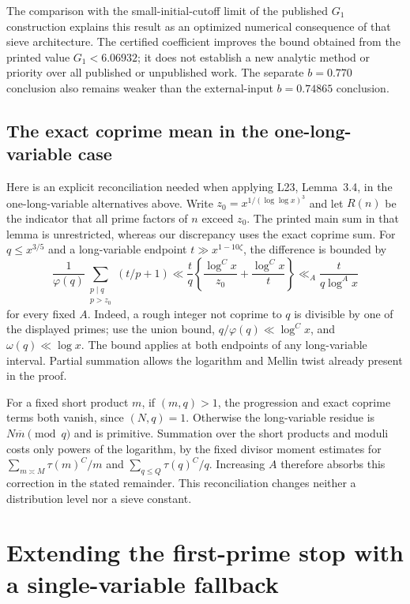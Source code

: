 \documentclass[11pt]{article}
\begin{document}
The comparison with the small-initial-cutoff limit of the published
$G_1$ construction explains this result as an optimized numerical
consequence of that sieve architecture. The certified coefficient
improves the bound obtained from the printed value $G_1<6.06932$;
it does not establish a new analytic method or priority over all
published or unpublished work. The separate $b=0.770$ conclusion
also remains weaker than the external-input $b=0.74865$ conclusion.

\subsection{The exact coprime mean in the one-long-variable case}
\label{sec:one-long-coprime-mean}
Here is an explicit reconciliation needed when applying L23,
Lemma~3.4, in the one-long-variable alternatives above.
Write $z_0=x^{1/(\log\log x)^3}$ and let $R(n)$ be the indicator
that all prime factors of $n$ exceed $z_0$. The printed main
sum in that lemma is unrestricted, whereas our discrepancy uses
the exact coprime sum. For $q\le x^{3/5}$ and a long-variable
endpoint $t\gg x^{1-10\zeta}$, the difference is bounded by
\[
 \frac{1}{\varphi(q)}
 \sum_{\substack{p\mid q\\p>z_0}}(t/p+1)
 \ll \frac tq\left\{\frac{\log^C x}{z_0}
                         +\frac{\log^C x}{t}\right\}
 \ll_A\frac{t}{q\log^A x}
\]
for every fixed $A$. Indeed, a rough integer not coprime to
$q$ is divisible by one of the displayed primes; use the union
bound, $q/\varphi(q)\ll\log^C x$, and
$\omega(q)\ll\log x$. The bound applies at both endpoints
of any long-variable interval. Partial summation allows the
logarithm and Mellin twist already present in the proof.

For a fixed short product $m$, if $(m,q)>1$, the progression
and exact coprime terms both vanish, since $(N,q)=1$.
Otherwise the long-variable residue is $N\overline m\pmod q$
and is primitive. Summation over the short products and
moduli costs only powers of the logarithm, by the fixed
divisor moment estimates for $\sum_{m\asymp M}\tau(m)^C/m$
and $\sum_{q\le Q}\tau(q)^C/q$. Increasing $A$ therefore
absorbs this correction in the stated remainder. This
reconciliation changes neither a distribution level nor a
sieve constant.
\section{Extending the first-prime stop with a single-variable fallback}
\label{sec:extended-prefix-upper}
\end{document}
